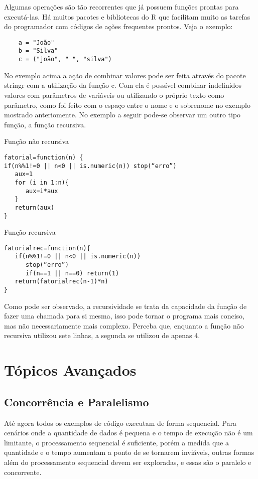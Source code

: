 \documentclass[12pt]{article}
\begin{document}
Algumas operações são tão recorrentes que já possuem funções prontas para executá-las. Há muitos pacotes e bibliotecas do R que facilitam muito as tarefas do programador com códigos de ações frequentes prontos. Veja o exemplo:

\begin{verbatim}
    a = "João"
    b = "Silva"
    c = ("joão", " ", "silva")
\end{verbatim}

No exemplo acima a ação de combinar valores pode ser feita através do pacote stringr com a utilização da função c. Com ela é possível combinar indefinidos valores com parâmetros de variáveis ou utilizando o próprio texto como parâmetro, como foi feito com o espaço entre o nome e o sobrenome no exemplo mostrado anteriomente. No exemplo a seguir pode-se observar um outro tipo função, a função recursiva.

Função não recursiva

\begin{verbatim}
fatorial=function(n) {
if(n%%1!=0 || n<0 || is.numeric(n)) stop(“erro”)                    
   aux=1
   for (i in 1:n){
      aux=i*aux
   }
   return(aux)
}
\end{verbatim}

Função  recursiva

\begin{verbatim}
fatorialrec=function(n){
   if(n%%1!=0 || n<0 || is.numeric(n))
      stop(“erro”)
      if(n==1 || n==0) return(1)
   return(fatorialrec(n-1)*n)
}
\end{verbatim}

Como pode ser observado, a recursividade se trata da capacidade da função de fazer uma chamada para si mesma, isso pode tornar o programa mais conciso, mas não necessariamente mais complexo. Perceba que, enquanto a função não recursiva utilizou sete linhas, a segunda se utilizou de apenas 4. 

\section{Tópicos Avançados} \label{sec:Tópicos Avançados}
\subsection{Concorrência e Paralelismo}

Até agora todos os exemplos de código executam de forma sequencial. Para cenários onde a quantidade de dados é pequena e o tempo de execução não é um limitante, o processamento sequencial é suficiente, porém a medida que a quantidade e o tempo aumentam a ponto de se tornarem inviáveis, outras formas além do processamento sequencial devem ser exploradas, e essas são o paralelo e concorrente.
\end{document}
